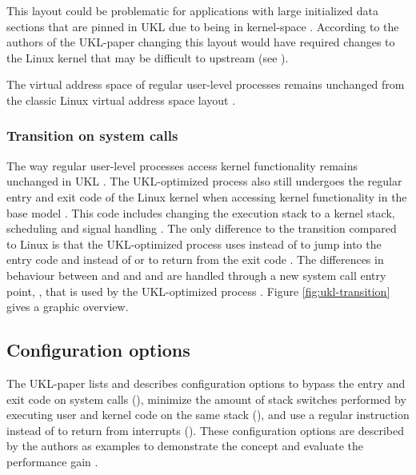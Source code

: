 \documentclass[10pt,twocolumn,a4paper]{article}
\begin{document}
      This layout could be problematic for applications with large initialized data sections
      that are pinned in UKL due to being in kernel-space \cite{raza23}.
      According to the authors of the UKL-paper changing this layout would have required changes
      to the Linux kernel that may be difficult to upstream (see ).

      The virtual address space of regular user-level processes remains unchanged from
      the classic Linux virtual address space layout \cite{raza23}.

    \subsubsection{Transition on system calls}\label{sec:transition}
      The way regular user-level processes access kernel functionality remains unchanged in UKL \cite{raza23}.
      The UKL-optimized process also still undergoes the regular entry and exit code of
      the Linux kernel when accessing kernel functionality in the base model \cite{raza23}.
      This code includes changing the execution stack to a kernel stack, scheduling and signal handling \cite{raza23}.
      The only difference to the transition compared to Linux is that the UKL-optimized process uses
       instead of  to jump into the entry code and  instead
      of  or  to return from the exit code \cite{ukl-glibc-syscalls}. 
      The differences in behaviour between  and  and 
       and  are handled through a new system call entry point, 
      , that is used by the UKL-optimized process \cite{raza23}.
      Figure \ref{fig:ukl-transition} gives a graphic overview.

      \begin{figure*}[hbt]
        \centering
        
        \caption{Transition between applications and kernel in UKL base model}
        \label{fig:ukl-transition}
      \end{figure*}

  \subsection{Configuration options}\label{sec:configuration-options}
    The UKL-paper lists and describes configuration options to bypass the entry and exit code
    on system calls (), minimize the amount of stack switches performed 
    by executing user and kernel code on the same stack (),
    and use a regular  instruction instead of  to return from 
    interrupts ().
    These configuration options are described by the authors as examples to demonstrate the concept
    and evaluate the performance gain \cite{raza23}.
\end{document}
